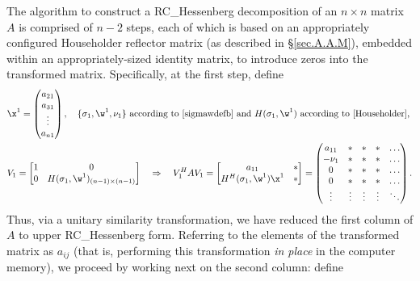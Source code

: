 The algorithm to construct a RC_Hessenberg decomposition of an $n\times
n$ matrix $A$ is comprised of $n-2$ steps, each of which is based
on an appropriately configured Householder reflector matrix (as
described in \S \ref{sec.A.A.M}), embedded within an appropriately-sized identity matrix, to introduce zeros into the
transformed matrix.  Specifically, at the first step, define
\begin{align*}
    &\x^{1}=\begin{pmatrix} a_{21} \\ a_{31} \\ \vdots \\ a_{n1} \end{pmatrix}, \quad
    \textrm{$\{\sigma_{1},\w^{1},\nu_{1}\}$ according to \eqref{sigmawdefb} and $H(\sigma_{1},\w^{1})$
    according to \eqref{Householder},}\\
    &V_{1}=\begin{bmatrix} 1 & 0 \\ 0 & H(\sigma_{1},\w^{1})_{(n-1)\times (n-1)} \end{bmatrix}
    \quad \Rightarrow \quad
    V_{1}^{H}A V_{1}=\begin{bmatrix} a_{11} & * \\ H^{H}(\sigma_{1},\w^{1})\x^{1} & * \end{bmatrix} =
    \begin{pmatrix} a_{11}     & * & * & * & \hdots \\
				      -\nu_{1} & * & * & * & \hdots \\
				      0          & * & * & * & \hdots \\
				      0          & * & * & * & \hdots \\
				      \vdots     & \vdots & \vdots & \vdots & \ddots \end{pmatrix}.
\end{align*}
Thus, via a unitary similarity transformation, we have reduced the first
column of $A$ to upper RC_Hessenberg form.  Referring to the elements of the
transformed matrix as $a_{ij}$ (that is, performing this
transformation {\it in place} in the computer memory), we proceed by
working next on the second column: define
\clearpage
